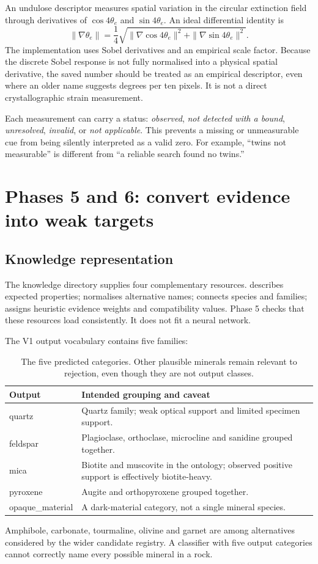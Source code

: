 An undulose descriptor measures spatial variation in the circular extinction field through derivatives of $\cos4\theta_e$ and $\sin4\theta_e$. An ideal differential identity is
\begin{equation}
\|\nabla\theta_e\|=\frac14\sqrt{\|\nabla\cos4\theta_e\|^2+\|\nabla\sin4\theta_e\|^2}.
\end{equation}
The implementation uses Sobel derivatives and an empirical scale factor. Because the discrete Sobel response is not fully normalised into a physical spatial derivative, the saved number should be treated as an empirical descriptor, even where an older name suggests degrees per ten pixels. It is not a direct crystallographic strain measurement.

Each measurement can carry a status: \emph{observed}, \emph{not detected with a bound}, \emph{unresolved}, \emph{invalid}, or \emph{not applicable}. This prevents a missing or unmeasurable cue from being silently interpreted as a valid zero. For example, ``twins not measurable'' is different from ``a reliable search found no twins.''

\section{Phases 5 and 6: convert evidence into weak targets}
\subsection{Knowledge representation}
The knowledge directory supplies four complementary resources.  describes expected properties;  normalises alternative names;  connects species and families;  assigns heuristic evidence weights and compatibility values. Phase 5 checks that these resources load consistently. It does not fit a neural network.

The V1 output vocabulary contains five families:
\begin{table}[htbp]\centering
\begin{tabularx}{\linewidth}{@{}lX@{}}\toprule Output & Intended grouping and caveat\\\midrule
quartz & Quartz family; weak optical support and limited specimen support.\\
feldspar & Plagioclase, orthoclase, microcline and sanidine grouped together.\\
mica & Biotite and muscovite in the ontology; observed positive support is effectively biotite-heavy.\\
pyroxene & Augite and orthopyroxene grouped together.\\
opaque\_material & A dark-material category, not a single mineral species.\\\bottomrule
\end{tabularx}
\caption{The five predicted categories. Other plausible minerals remain relevant to rejection, even though they are not output classes.}
\end{table}
Amphibole, carbonate, tourmaline, olivine and garnet are among alternatives considered by the wider candidate registry. A classifier with five output categories cannot correctly name every possible mineral in a rock.

